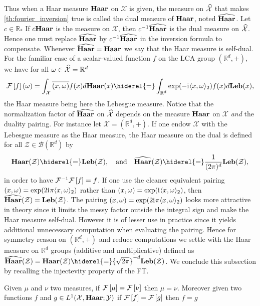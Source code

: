 Thus when a Haar measure $\mathbf{Haar}$ on $\mathcal{X}$ is given, the measure on
$\widehat{\mathcal{X}}$ that makes \cref{th:fourier_inversion} true is called the
dual measure of $\mathbf{Haar}$, noted $\widehat{\mathbf{Haar}}$. Let $c\in\mathbb{R}_*$ If
$c\mathbf{Haar}$ is the measure on $\mathcal{X}$, then $c^{-1}\widehat{\mathbf{Haar}}$ is the dual
measure on $\widehat{\mathcal{X}}$. Hence one must replace $\widehat{\mathbf{Haar}}$ by
$c^{-1}\widehat{\mathbf{Haar}}$ in the inversion formula to compensate. Whenever
$\widehat{\mathbf{Haar}}=\mathbf{Haar}$ we say that the Haar measure is self-dual. For the
familiar case of a scalar-valued function $f$ on the \ac{LCA} group
$(\mathbb{R}^d, +)$, we have for all $\omega\in
\widehat{\mathcal{X}}=\mathbb{R}^d$
\begin{dmath}
    \label{fourier-R-plus}
    \FT{f}(\omega)
    =\int_{\mathcal{X}} \conj{\pairing{x,\omega}}f(x)d\Haar(x)
    \hiderel{=}\int_{\mathbb{R}^d} \exp(-\iu \inner{x,\omega}_2)f(x) d\Leb(x),
\end{dmath}
the Haar measure being here the Lebesgue measure. Notice that the normalization
factor of $\widehat{\mathbf{Haar}}$ on $\widehat{\mathcal{X}}$ depends on the measure $\mathbf{Haar}$
on $\mathcal{X}$ \emph{and} the duality pairing. For instance let
$\mathcal{X}=(\mathbb{R}^d, +)$. If one endow $\mathcal{X}$ with the
Lebesgue measure as the Haar measure, the Haar measure on the dual is defined
for all $\mathcal{Z}\in\mathcal{B}(\mathbb{R}^d)$ by
\begin{dmath*}
    \Haar(\mathcal{Z})\hiderel{=}\Leb(\mathcal{Z}),
    \quad\text{and}\quad
    \dual{\Haar}(\mathcal{Z})\hiderel{=}\frac{1}{(2\pi)^d}\Leb(\mathcal{Z}),
\end{dmath*}
in order to have $\mathcal{F}^{-1}\mathcal{F}\left[f\right]=f$. If one use the cleaner equivalent
pairing $(x,\omega)=\exp(2{\mathrm{i}\mkern1mu}\pi \langle x, \omega\rangle_2)$ rather than
$(x,\omega)=\exp({\mathrm{i}\mkern1mu} \langle x,\omega\rangle_2)$, then
$\widehat{\mathbf{Haar}}(\mathcal{Z})=\mathbf{Leb}(\mathcal{Z})$.  The pairing
$(x,\omega)=\exp(2{\mathrm{i}\mkern1mu}\pi \langle x,\omega\rangle_2)$ looks more attractive in
theory since it limits the messy factor outside the integral sign and make the
Haar measure self-dual. However it is of lesser use in practice since it yields
additional unnecessary computation when evaluating the pairing.  Hence for
symmetry reason on $(\mathbb{R}^d, +)$ and reduce computations we settle with
the Haar measure on $\mathbb{R}^d$ groups (additive and multiplicative) defined
as $\dual{\Haar}(\mathcal{Z}) = \Haar(\mathcal{Z}) \hiderel{=}
{\sqrt{2\pi}}^{-d} \Leb(\mathcal{Z})$.  We conclude this subsection by recalling
the injectevity property of the \acl{FT}.
\begin{corollary}
    Given $\mu$ and $\nu$ two measures, if $\mathcal{F}\left[\mu\right]=\mathcal{F}\left[\nu\right]$ then $\mu=\nu$.
    Moreover given two functions $f$ and $g\in
    L^1(\mathcal{X},\mathbf{Haar};\mathcal{Y})$ if $\mathcal{F}\left[f\right]=\mathcal{F}\left[g\right]$ then $f=g$
\end{corollary}

